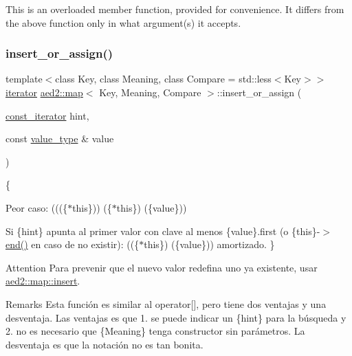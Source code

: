 This is an overloaded member function, provided for convenience. It differs from the above function only in what argument(s) it accepts. \mbox{\label{classaed2_1_1map_a2ef6723c183916276b0afc4a4c721475}} 
\subsubsection{\texorpdfstring{insert\+\_\+or\+\_\+assign()}{insert\_or\_assign()}\hspace{0.1cm}{\footnotesize\ttfamily [1/4]}}
{\footnotesize\ttfamily template$<$class Key, class Meaning, class Compare = std\+::less$<$\+Key$>$$>$ \\
\hyperlink{classaed2_1_1map_1_1iterator}{iterator} \hyperlink{classaed2_1_1map}{aed2\+::map}$<$ Key, Meaning, Compare $>$\+::insert\+\_\+or\+\_\+assign (\begin{DoxyParamCaption}\item[{\hyperlink{classaed2_1_1map_1_1const__iterator}{const\+\_\+iterator}}]{hint,  }\item[{const \hyperlink{classaed2_1_1map_a719db98e0ff9a837610f76be33264680}{value\+\_\+type} \&}]{value }\end{DoxyParamCaption})\hspace{0.3cm}{\ttfamily [inline]}}

\{
\begin{DoxyItemize}
\item Peor caso\+: (((\{$\ast$this\}))  (\{$\ast$this\})  (\{value\}))
\item Si \{hint\} apunta al primer valor con clave al menos \{value\}.first (o \{this\}-\/$>$\hyperlink{classaed2_1_1map_a76023e6a56cb625513e1b5ea028bf983}{end()} en caso de no existir)\+: ((\{$\ast$this\})  (\{value\})) amortizado. \}
\end{DoxyItemize}

\begin{DoxyAttention}{Attention}
Para prevenir que el nuevo valor redefina uno ya existente, usar \hyperlink{classaed2_1_1map_a6941cde9a79c27f054b5c97a587a1854}{aed2\+::map\+::insert}. 
\end{DoxyAttention}
\begin{DoxyRemark}{Remarks}
Esta función es similar al operator\mbox{[}\mbox{]}, pero tiene dos ventajas y una desventaja. Las ventajas es que 1. se puede indicar un \{hint\} para la búsqueda y 2. no es necesario que \{Meaning\} tenga constructor sin parámetros. La desventaja es que la notación no es tan bonita. 
\end{DoxyRemark}
\mbox{\label{classaed2_1_1map_a2ef6723c183916276b0afc4a4c721475}} 
